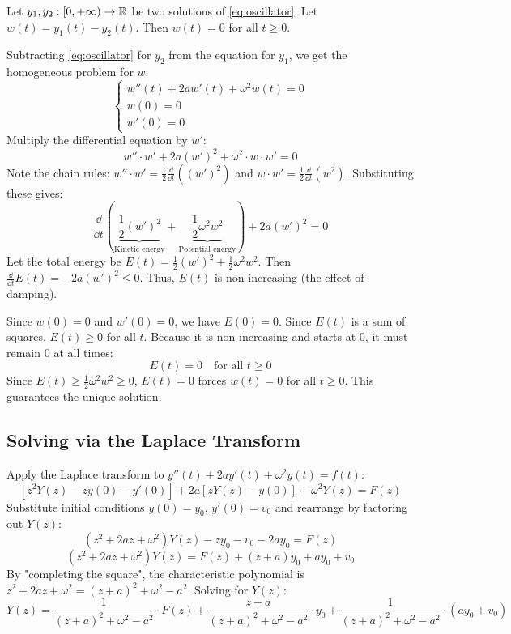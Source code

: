 \begin{theorem}
Let $y_1, y_2 : [0, +\infty) \to \mathbb{R}$ be two solutions of \eqref{eq:oscillator}. Let $w(t) = y_1(t) - y_2(t)$. Then $w(t) = 0$ for all $t \ge 0$.
\end{theorem}

\begin{proofbox}
Subtracting \eqref{eq:oscillator} for $y_2$ from the equation for $y_1$, we get the homogeneous problem for $w$:
\[
\begin{cases}
w''(t) + 2a w'(t) + \omega^2 w(t) = 0 \\
w(0) = 0 \\
w'(0) = 0
\end{cases}
\]
Multiply the differential equation by $w'$:
\[
w'' \cdot w' + 2a(w')^2 + \omega^2 \cdot w \cdot w' = 0
\]
Note the chain rules: $w'' \cdot w' = \frac{1}{2}\frac{\dd}{\dd t}((w')^2)$ and $w \cdot w' = \frac{1}{2}\frac{\dd}{\dd t}(w^2)$. Substituting these gives:
\[
\frac{\dd}{\dd t}\left( \underbrace{\frac{1}{2}(w')^2}_{\text{Kinetic energy}} + \underbrace{\frac{1}{2}\omega^2 w^2}_{\text{Potential energy}} \right) + 2a(w')^2 = 0
\]
Let the total energy be $E(t) = \frac{1}{2}(w')^2 + \frac{1}{2}\omega^2 w^2$. Then $\frac{\dd}{\dd t}E(t) = -2a(w')^2 \le 0$. Thus, $E(t)$ is non-increasing (the effect of damping).

Since $w(0) = 0$ and $w'(0) = 0$, we have $E(0) = 0$. Since $E(t)$ is a sum of squares, $E(t) \ge 0$ for all $t$. Because it is non-increasing and starts at $0$, it must remain $0$ at all times:
\[
E(t) = 0 \quad \text{for all } t \ge 0
\]
Since $E(t) \ge \frac{1}{2}\omega^2 w^2 \ge 0$, $E(t)=0$ forces $w(t) = 0$ for all $t \ge 0$. This guarantees the unique solution.
\end{proofbox}

\subsection{Solving via the Laplace Transform}

Apply the Laplace transform to $y''(t) + 2a y'(t) + \omega^2 y(t) = f(t)$:
\[
\left[z^2 Y(z) - z y(0) - y'(0)\right] + 2a\left[z Y(z) - y(0)\right] + \omega^2 Y(z) = F(z)
\]
Substitute initial conditions $y(0) = y_0$, $y'(0) = v_0$ and rearrange by factoring out $Y(z)$:
\[
(z^2 + 2az + \omega^2)Y(z) - z y_0 - v_0 - 2ay_0 = F(z)
\]
\[
(z^2 + 2az + \omega^2)Y(z) = F(z) + (z+a)y_0 + ay_0 + v_0
\]
By "completing the square", the characteristic polynomial is $z^2 + 2az + \omega^2 = (z+a)^2 + \omega^2 - a^2$. Solving for $Y(z)$:
\[
Y(z) = \frac{1}{(z+a)^2 + \omega^2 - a^2} \cdot F(z) + \frac{z+a}{(z+a)^2 + \omega^2 - a^2} \cdot y_0 + \frac{1}{(z+a)^2 + \omega^2 - a^2} \cdot (ay_0 + v_0)
\]

